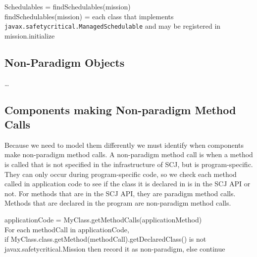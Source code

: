 \documentclass[10pt,a4paper]{article}
\newenvironment{ttSection}{\ttfamily}{\par}
\begin{document}
\begin{ttSection}
Schedulables = findSchedulables(mission)\\

findSchedulables(mission) = each class that implements \texttt{javax.safetycritical.ManagedSchedulable} and may be registered in mission.initialize
\end{ttSection}

\subsection{Non-Paradigm Objects}

\ldots

\subsection{Components making Non-paradigm Method Calls}
Because we need to model them differently we must identify when components make non-paradigm method calls. A non-paradigm method call is when a method is called that is not specified in the infrastructure of SCJ, but is program-specific. They can only occur during program-specific code, so we check each method called in application code to see if the class it is declared in is in the SCJ API or not. For methods that are in the SCJ API, they are paradigm method calls. Methods that are declared in the program are non-paradigm method calls. 

\begin{ttSection}
applicationCode = MyClass.getMethodCalls(applicationMethod)\\

For each methodCall in applicationCode, \\
if MyClass.class.getMethod(methodCall).getDeclaredClass() is not javax.safetycritical.Mission then record it as non-paradigm, else continue
\end{ttSection}
\end{document}
